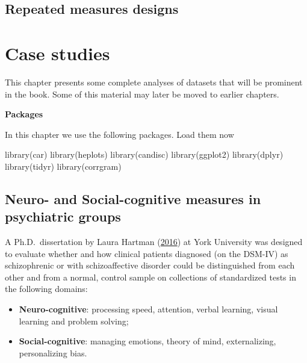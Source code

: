 \documentclass[
  letterpaper,
  10pt,
  krantz2]{krantz}
\makeatletter
\newenvironment{Shaded}{\begin{snugshade}}{\end{snugshade}}
\newcommand{\FunctionTok}[1]{\textcolor[rgb]{0.28,0.35,0.67}{#1}}
\newcommand{\NormalTok}[1]{\textcolor[rgb]{0.00,0.23,0.31}{#1}}
\newenvironment{kframe}{%
  \medskip{}
  \setlength{\fboxsep}{.8em}
  \def\at@end@of@kframe{}%
  \ifinner\ifhmode%
  \def\at@end@of@kframe{\end{minipage}}%
  \begin{minipage}{\columnwidth}%
  \fi\fi%
  \def\FrameCommand##1{\hskip\@totalleftmargin \hskip-\fboxsep
  \colorbox{shadecolor}{##1}\hskip-\fboxsep
      \hskip-\linewidth \hskip-\@totalleftmargin \hskip\columnwidth}%
  \MakeFramed {\advance\hsize-\width
    \@totalleftmargin\z@ \linewidth\hsize
    \@setminipage}}%
{\par\unskip\endMakeFramed%
  \at@end@of@kframe}
\renewenvironment{Shaded}{\begin{kframe}}{\end{kframe}}
\makeatother
\begin{document}
\hypertarget{repeated-measures-designs}{%
\section{Repeated measures designs}\label{repeated-measures-designs}}


\hypertarget{case-studies}{%
\chapter{Case studies}\label{case-studies}}

This chapter presents some complete analyses of datasets that will be
prominent in the book. Some of this material may later be moved to
earlier chapters.

\textbf{Packages}

In this chapter we use the following packages. Load them now

\begin{Shaded}
\begin{Highlighting}[]
\FunctionTok{library}\NormalTok{(car)}
\FunctionTok{library}\NormalTok{(heplots)}
\FunctionTok{library}\NormalTok{(candisc)}
\FunctionTok{library}\NormalTok{(ggplot2)}
\FunctionTok{library}\NormalTok{(dplyr)}
\FunctionTok{library}\NormalTok{(tidyr)}
\FunctionTok{library}\NormalTok{(corrgram)}
\end{Highlighting}
\end{Shaded}

\hypertarget{neuro--and-social-cognitive-measures-in-psychiatric-groups}{%
\section{Neuro- and Social-cognitive measures in psychiatric
groups}\label{neuro--and-social-cognitive-measures-in-psychiatric-groups}}

A Ph.D.~dissertation by Laura Hartman
(\protect\hyperlink{ref-Hartman:2016}{2016}) at York University was
designed to evaluate whether and how clinical patients diagnosed (on the
DSM-IV) as schizophrenic or with schizoaffective disorder could be
distinguished from each other and from a normal, control sample on
collections of standardized tests in the following domains:

\begin{itemize}
\item
  \textbf{Neuro-cognitive}: processing speed, attention, verbal
  learning, visual learning and problem solving;
\item
  \textbf{Social-cognitive}: managing emotions, theory of mind,
  externalizing, personalizing bias.
\end{itemize}
\end{document}
